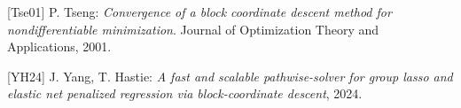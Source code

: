 \documentclass[11pt]{article}
\begin{document}
\newpage

\begin{thebibliography}{5}
 
    [Tse01] P. Tseng: \emph{Convergence of a block coordinate descent method for nondifferentiable 
    minimization}. Journal of Optimization Theory and Applications, 2001.

    [YH24] J. Yang, T. Hastie: \emph{A fast and scalable pathwise-solver for group lasso and elastic
    net penalized regression via block-coordinate descent}, 2024. 
\end{thebibliography}
\end{document}
